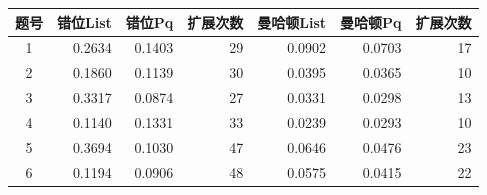 \begin{tabular}{crrrrrr}
\hline
\textbf{题号} & \textbf{错位List} & \textbf{错位Pq} & \textbf{扩展次数} & \textbf{曼哈顿List} & \textbf{曼哈顿Pq} & \textbf{扩展次数} \\
\hline
1 & 0.2634 & 0.1403 & 29 & 0.0902 & 0.0703 & 17 \\
2 & 0.1860 & 0.1139 & 30 & 0.0395 & 0.0365 & 10 \\
3 & 0.3317 & 0.0874 & 27 & 0.0331 & 0.0298 & 13 \\
4 & 0.1140 & 0.1331 & 33 & 0.0239 & 0.0293 & 10 \\
5 & 0.3694 & 0.1030 & 47 & 0.0646 & 0.0476 & 23 \\
6 & 0.1194 & 0.0906 & 48 & 0.0575 & 0.0415 & 22 \\
\hline
\end{tabular}
